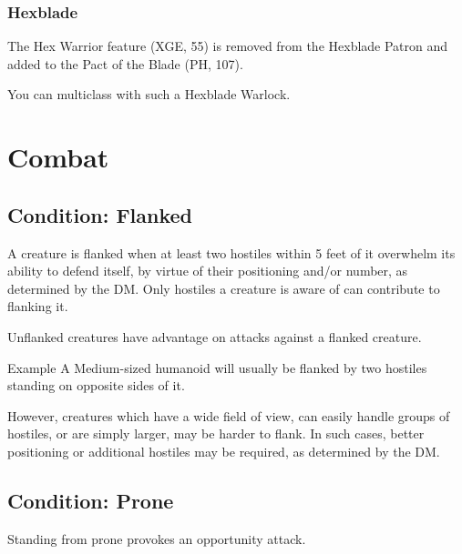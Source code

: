 \documentclass[House_Rules.tex]{subfiles}
\begin{document}
\subsubsection{Hexblade}
The Hex Warrior feature (XGE, 55) is removed from the Hexblade Patron and added to the Pact of the Blade (PH, 107).

You can multiclass with such a Hexblade Warlock.


\section{Combat}

\subsection{Condition: Flanked}
A creature is flanked when at least two hostiles within 5 feet of it overwhelm its ability to defend itself, by virtue of their positioning and/or number, as determined by the DM. Only hostiles a creature is aware of can contribute to flanking it.

Unflanked creatures have advantage on attacks against a flanked creature.

\begin{DndComment}{Example}
A Medium-sized humanoid will usually be flanked by two hostiles standing on opposite sides of it.

However, creatures which have a wide field of view, can easily handle groups of hostiles, or are simply larger, may be harder to flank. In such cases, better positioning or additional hostiles may be required, as determined by the DM.
\end{DndComment}

\subsection{Condition: Prone}
Standing from prone provokes an opportunity attack.
\end{document}
